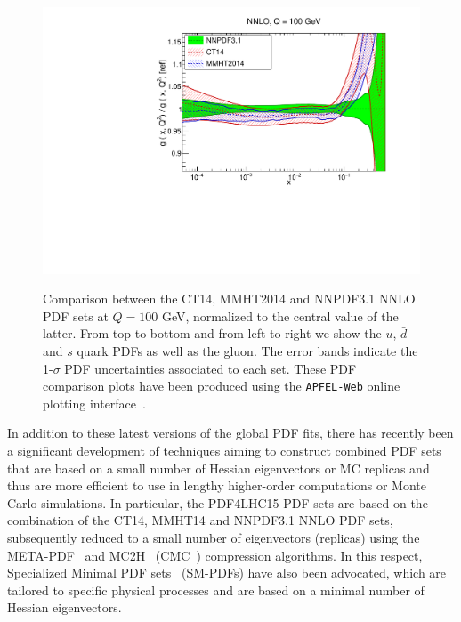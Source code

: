 \begin{figure}[!t]
 \includegraphics[scale=0.37]{plots/xg-31-nnlo-globalfits.pdf}\\
 \caption{\small Comparison between the CT14, MMHT2014
  and NNPDF3.1 NNLO PDF sets at $Q=100$ GeV, normalized
  to the central value of the latter.
  From top to bottom and from left to right we show the
  $u$, $\bar{d}$ and $s$ quark PDFs as well as the gluon.
  The error bands indicate the 1-$\sigma$ PDF uncertainties
  associated to each set.
  These PDF comparison plots have been produced using the
  {\tt APFEL-Web} online plotting interface~\cite{Carrazza:2014gfa}.
    \label{fig:globalfits}
  }
\end{figure}

In addition to these latest versions of the global PDF fits,
there has recently been a significant development of techniques aiming
to construct combined PDF sets that are based on
a small number of Hessian eigenvectors or MC replicas and thus
are more efficient to use in lengthy higher-order
computations or Monte Carlo simulations.
%
In particular, the PDF4LHC15 PDF sets are based on the
combination of the CT14, MMHT14 and NNPDF3.1 NNLO PDF sets,
subsequently reduced to a small number of eigenvectors
(replicas) using the META-PDF~\cite{Gao:2013bia}
and MC2H~\cite{Carrazza:2015aoa}
(CMC~\cite{Carrazza:2015hva}) compression algorithms.
%
In this respect, Specialized Minimal PDF sets~\cite{Carrazza:2016htc}
(SM-PDFs) have also
been advocated, which
are tailored to specific physical processes and are based
on a minimal number of Hessian eigenvectors.
%

